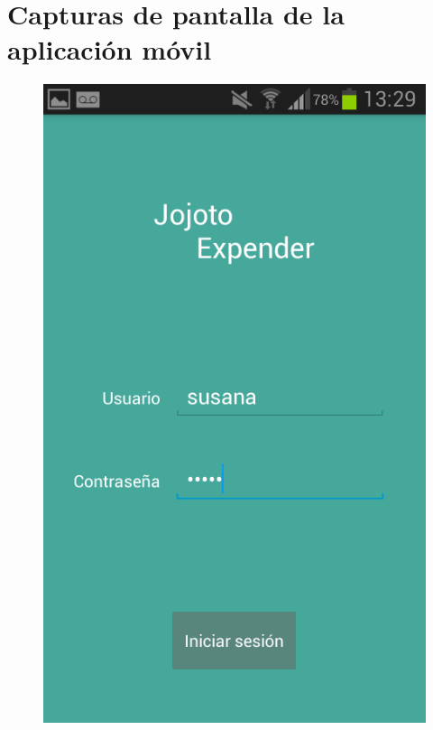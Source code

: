 \chapter{Capturas de pantalla de la aplicación móvil}

\begin{figure}[ht]
\centering
\begin{minipage}{.5\textwidth}
  \centering
  \includegraphics[scale=0.30,type=png,ext=.png,read=.png]{imagenes/Screenshots/login_mobile}
  \captionsetup{justification=centering}
  \label{fig:interfazLoginMobile}
\end{minipage}%
\begin{minipage}{.5\textwidth}  

\end{minipage}
\end{figure}
